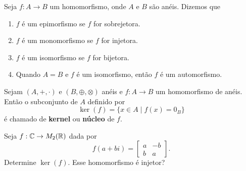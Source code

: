 \begin{definicao}Seja $f:A\rightarrow B$ um homomorfismo, onde $A$ e $B$ s{\~a}o an{\'e}is. Dizemos que
	\begin{enumerate}[label={\roman*})]
		\item $f$ {\'e} um epimorfismo se $f$ for sobrejetora.
		\item $f$ {\'e} um monomorfismo se $f$ for injetora.
		\item $f$ {\'e} um isomorfismo se $f$ for bijetora.
		\item Quando $A=B$ e $f$ {\'e} um isomorfismo, ent{\~a}o $f$ {\'e} um automorfismo.
	\end{enumerate}
\end{definicao}

\begin{definicao}
	Sejam $(A, +, \cdot)$ e $(B, \oplus, \otimes)$ an\'eis e $f : A \to B$ um homomorfismo de an\'eis. Ent\~ao o subconjunto de $A$ definido por
	\[
		\ker(f) = \{ x \in A \mid f(x) = 0_B\}
	\]
	\'e chamado de \textbf{kernel} ou \textbf{n\'ucleo} de $f$.
\end{definicao}

\begin{exemplo}
    Seja $f : \mathbb{C} \to M_2(\mathbb{R})$ dada por
    \[
        f(a + bi) = \begin{bmatrix}
            a & -b\\
            b & a
        \end{bmatrix}.
    \]
    Determine $\ker(f)$. Esse homomorfismo é injetor?
\end{exemplo}

